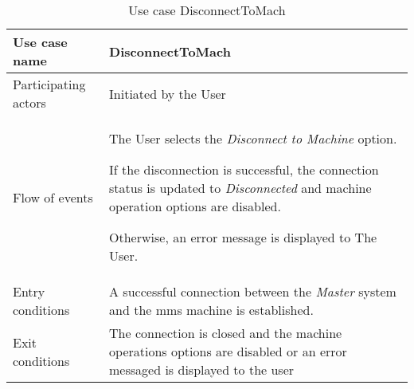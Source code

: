 \begin{table}
  \captionsetup{justification=raggedright, singlelinecheck=false}
  \caption{Use case DisconnectToMach}
  \centering
  \begin{tabular}{p{}p{}}
    \hline
    Use case name & \textbf{DisconnectToMach} \\ \hline
     Participating actors      & Initiated by the User \\ \hline
     Flow of events & \begin{enum-c}
     \item The User selects the \emph{Disconnect to Machine} option.
     \item If the disconnection is successful, the connection status is updated to
       \emph{Disconnected} and machine operation options are disabled.
     \item Otherwise, an error message is displayed to The User.
     \end{enum-c}\\ \hline 
     Entry conditions       & A successful connection between the \emph{Master} system
     and the \gls{mms} machine is established.\\ \hline 
      Exit conditions & The connection is closed and the machine operations
      options are disabled or an error messaged is displayed to the user \\ \hline 
  \end{tabular}
\label{tab:us-discon-to-mach}
\end{table}

